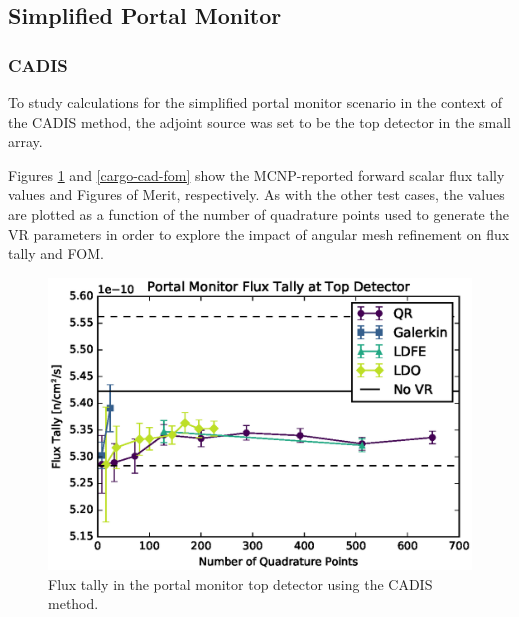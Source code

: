 \documentclass{article} %
\begin{document}
\subsection{Simplified Portal Monitor}

\subsubsection{CADIS}

To study calculations for the simplified portal monitor scenario in the context
of the CADIS method, the adjoint source was set to be the top detector in the
small array.

Figures \ref{cargo-cad-tally} and \ref{cargo-cad-fom} show the MCNP-reported
forward scalar flux tally values and Figures of Merit, respectively. As with
the other test cases, the values are plotted as a function of the number of
quadrature points used to generate the VR parameters in order to explore
the impact of angular mesh refinement on flux tally and FOM.

\begin{figure}[!htb]
\centering
\includegraphics[max height=0.445\textheight]{portal-cadis-tally.eps}
\caption{Flux tally in the portal monitor top detector using the CADIS method.}
\label{cargo-cad-tally}
\end{figure}
\end{document}
